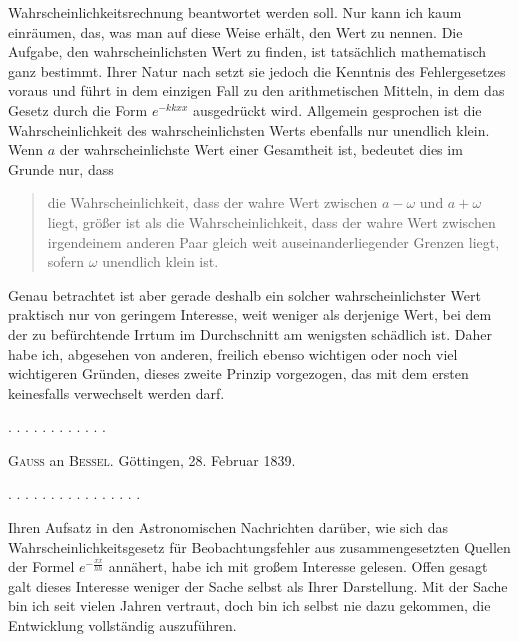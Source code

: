 Wahrscheinlichkeitsrechnung beantwortet werden soll. Nur kann ich kaum einräumen, das, was man auf diese Weise erhält, den  Wert zu nennen. Die Aufgabe, den wahrscheinlichsten Wert zu finden, ist tatsächlich mathematisch ganz bestimmt. Ihrer Natur nach setzt sie jedoch die Kenntnis des Fehlergesetzes voraus und führt  in dem einzigen Fall zu den arithmetischen Mitteln, in dem das Gesetz durch die Form $e^{-kkxx}$ ausgedrückt wird. Allgemein gesprochen ist die Wahrscheinlichkeit des wahrscheinlichsten Werts ebenfalls nur unendlich klein. Wenn $a$ der wahrscheinlichste Wert einer  Gesamtheit ist, bedeutet dies im Grunde nur, dass

\begin{quote}
die Wahrscheinlichkeit, dass der wahre Wert zwischen $a-\omega$ und $a+\omega$ liegt, größer ist als die Wahrscheinlichkeit, dass der wahre Wert zwischen irgendeinem anderen Paar gleich weit auseinanderliegender Grenzen liegt, sofern $\omega$ unendlich klein ist.
\end{quote}

Genau betrachtet ist aber gerade deshalb ein solcher wahrscheinlichster Wert praktisch nur von geringem Interesse, weit weniger als derjenige Wert, bei dem der zu befürchtende Irrtum im Durchschnitt am wenigsten schädlich ist. Daher habe ich, abgesehen von anderen, freilich ebenso wichtigen oder noch viel wichtigeren Gründen, dieses zweite Prinzip vorgezogen, das mit dem ersten keinesfalls verwechselt werden darf.

. . . . . . . . . . . .

\begin{center}\textsc{Gauss} an \textsc{Bessel}. Göttingen, 28. Februar 1839.\end{center}

. . . . . . . . . . . . . . . .

Ihren Aufsatz in den Astronomischen Nachrichten darüber, wie sich das Wahrscheinlichkeitsgesetz für Beobachtungsfehler aus zusammengesetzten Quellen der Formel $e^{-\frac{xx}{hh}}$ annähert, habe ich mit großem Interesse gelesen. Offen gesagt galt dieses Interesse weniger der Sache selbst als Ihrer Darstellung. Mit der Sache bin ich seit vielen Jahren vertraut, doch bin ich selbst nie dazu gekommen, die Entwicklung vollständig auszuführen.

